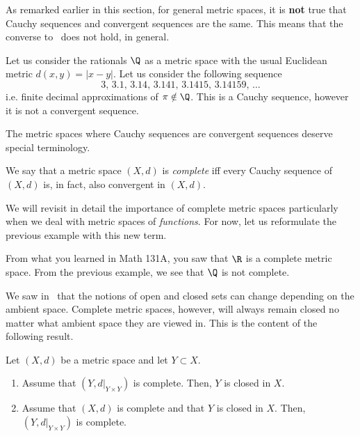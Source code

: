 As remarked earlier in this section, for general metric spaces, it is \textbf{not} true that Cauchy sequences and convergent sequences are the same. This means that the converse to~ does not hold, in general.
\begin{eg}
Let us consider the rationals $\Q$ as a metric space with the usual Euclidean metric $d(x,y) = |x-y|$. Let us consider the following sequence
\[
3,\, 3.1, \, 3.14, \, 3.141, \, 3.1415, \, 3.14159,\, \dots
\]
i.e. finite decimal approximations of $\pi\notin \Q$. This is a Cauchy sequence, however it is not a convergent sequence.
\end{eg}
The metric spaces where Cauchy sequences are convergent sequences deserve special terminology.
\begin{defn}
\label{defn:complete}
We say that a metric space $(X,d)$ is \textit{complete} iff every Cauchy sequence of $(X,d)$ is, in fact, also convergent in $(X,d)$.
\end{defn}
We will revisit in detail the importance of complete metric spaces particularly when we deal with metric spaces of \textit{functions}. For now, let us reformulate the previous example with this new term.
\begin{eg}
From what you learned in Math 131A, you saw that $\R$ is a complete metric space. From the previous example, we see that $\Q$ is not complete.
\end{eg}
We saw in~ that the notions of open and closed sets can change depending on the ambient space. Complete metric spaces, however, will always remain closed no matter what ambient space they are viewed in. This is the content of the following result.
\begin{prop}
\label{prop:comp_clos}
Let $(X,d)$ be a metric space and let $Y\subset X$.
\begin{enumerate}
	\item \label{comp_clos_1} Assume that $(Y,d|_{Y\times Y})$ is complete. Then, $Y$ is closed in $X$.
	\item \label{comp_clos_2} Assume that $(X,d)$ is complete and that $Y$ is closed in $X$. Then, $(Y,d|_{Y\times Y})$ is complete.
\end{enumerate}
\end{prop}
